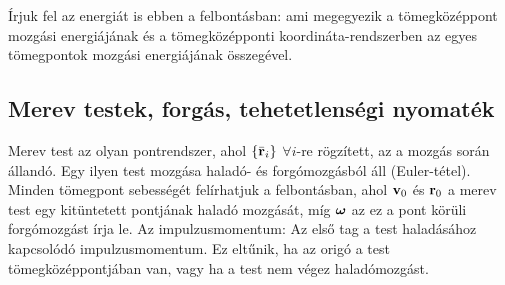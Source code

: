    Írjuk fel az energiát is ebben a felbontásban:
   ami megegyezik a tömegközéppont mozgási energiájának és a tömegközépponti koordináta-rendszerben az egyes tömegpontok mozgási energiájának összegével. 
   
   \subsection{Merev testek, forgás, tehetetlenségi nyomaték}
   
   Merev test az olyan pontrendszer, ahol $\{\bar{\mathbf{r}}_i\}$ $\forall i$-re rögzített, az a mozgás során állandó. Egy ilyen test mozgása haladó- és forgómozgásból áll (Euler-tétel). Minden tömegpont sebességét felírhatjuk a 
   felbontásban, ahol $\mathbf{v}_0$ és $\mathbf{r}_0$ a merev test egy kitüntetett pontjának haladó mozgását, míg $\boldsymbol{\omega}$ az ez a pont körüli forgómozgást írja le. Az impulzusmomentum:
   Az első tag a test haladásához kapcsolódó impulzusmomentum. Ez eltűnik, ha az origó a test tömegközéppontjában van, vagy ha a test nem végez haladómozgást. 
   
